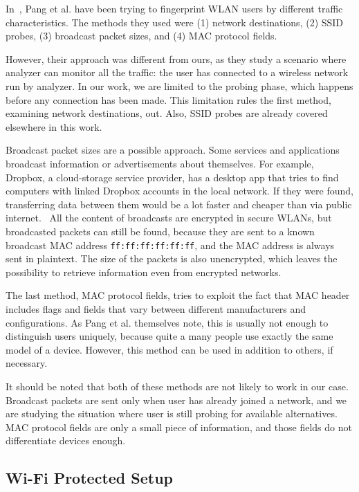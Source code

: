 \documentclass[12pt,a4paper,oneside,pdftex]{report}
\begin{document}
In~\cite{pang2007802}, Pang et al. have been trying to fingerprint WLAN users by different traffic characteristics. The methods they used were (1) network destinations, (2) SSID probes, (3) broadcast packet sizes, and (4) MAC protocol fields. 

However, their approach was different from ours, as they study a scenario where analyzer can monitor all the traffic: the user has connected to a wireless network run by analyzer. In our work, we are limited to the probing phase, which happens before any connection has been made. This limitation rules the first method, examining network destinations, out. Also, SSID probes are already covered elsewhere in this work.

Broadcast packet sizes are a possible approach. Some services and applications broadcast information or advertisements about themselves. For example, Dropbox, a cloud-storage service provider, has a desktop app that tries to find computers with linked Dropbox accounts in the local network. If they were found, transferring data between them would be a lot faster and cheaper than via public internet.~\cite{dropboxlan} All the content of broadcasts are encrypted in secure WLANs, but broadcasted packets can still be found, because they are sent to a known broadcast MAC address \texttt{ff:ff:ff:ff:ff:ff}, and the MAC address is always sent in plaintext. The size of the packets is also unencrypted, which leaves the possibility to retrieve information even from encrypted networks.

The last method, MAC protocol fields, tries to exploit the fact that MAC header includes flags and fields that vary between different manufacturers and configurations. As Pang et al. themselves note, this is usually not enough to distinguish users uniquely, because quite a many people use exactly the same model of a device. However, this method can be used in addition to others, if necessary.

It should be noted that both of these methods are not likely to work in our case. Broadcast packets are sent only when user has already joined a network, and we are studying the situation where user is still probing for available alternatives. MAC protocol fields are only a small piece of information, and those fields do not differentiate devices enough.

\subsection{Wi-Fi Protected Setup}
\label{sec:wps}
\end{document}
